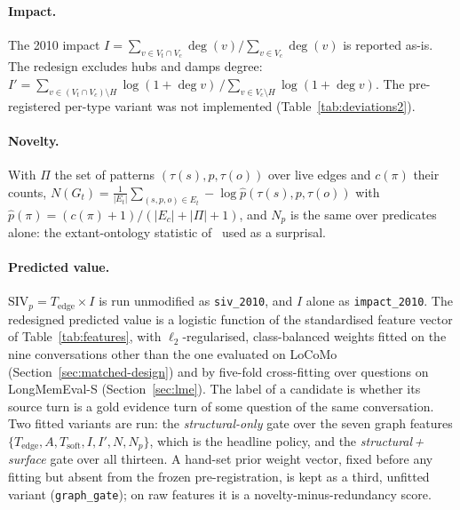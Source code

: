 \documentclass{ceurart}
\newcommand{\Gt}{G_t}
\newcommand{\Ec}{E_c}
\newcommand{\Et}{E_t}
\newcommand{\Vc}{V_c}
\newcommand{\Vt}{V_t}
\newcommand{\Hub}{H}
\newcommand{\Tedge}{T_{\mathrm{edge}}}
\newcommand{\Tsoft}{T_{\mathrm{soft}}}
\newcommand{\Anc}{A}
\newcommand{\Imp}{I}
\newcommand{\Implog}{I'}
\newcommand{\Nov}{N}
\newcommand{\Novp}{N_p}
\newcommand{\SIVp}{\mathrm{SIV}_p}
\newcommand{\degv}{\deg}
\newcommand{\code}[1]{\texttt{#1}}
\begin{document}
\paragraph{Impact.} The 2010 impact $\Imp=\sum_{v\in\Vt\cap\Vc}\degv(v)/\sum_{v\in\Vc}\degv(v)$ is reported as-is. The redesign excludes hubs and damps degree: $\Implog=\sum_{v\in(\Vt\cap\Vc)\setminus\Hub}\log(1+\degv v)\,/\sum_{v\in\Vc\setminus\Hub}\log(1+\degv v)$. The pre-registered per-type variant was not implemented (Table~\ref{tab:deviations2}).

\paragraph{Novelty.} With $\Pi$ the set of patterns $(\tau(s),p,\tau(o))$ over live edges and $c(\pi)$ their counts, $\Nov(\Gt)=\frac{1}{|\Et|}\sum_{(s,p,o)\in\Et}-\log\hat p(\tau(s),p,\tau(o))$ with $\hat p(\pi)=(c(\pi)+1)/(|\Ec|+|\Pi|+1)$, and $\Novp$ is the same over predicates alone: the extant-ontology statistic of~\cite{alsaffar2011extant} used as a surprisal.

\paragraph{Predicted value.} $\SIVp=\Tedge\times\Imp$ is run unmodified as \code{siv\_2010}, and $\Imp$ alone as \code{impact\_2010}. The redesigned predicted value is a logistic function of the standardised feature vector of Table~\ref{tab:features}, with $\ell_2$-regularised, class-balanced weights fitted on the nine conversations other than the one evaluated on LoCoMo (Section~\ref{sec:matched-design}) and by five-fold cross-fitting over questions on LongMemEval-S (Section~\ref{sec:lme}). The label of a candidate is whether its source turn is a gold evidence turn of some question of the same conversation. Two fitted variants are run: the \emph{structural-only} gate over the seven graph features $\{\Tedge,\Anc,\Tsoft,\Imp,\Implog,\Nov,\Novp\}$, which is the headline policy, and the \emph{structural\,+\,surface} gate over all thirteen. A hand-set prior weight vector, fixed before any fitting but absent from the frozen pre-registration, is kept as a third, unfitted variant (\code{graph\_gate}); on raw features it is a novelty-minus-redundancy score.
\end{document}
